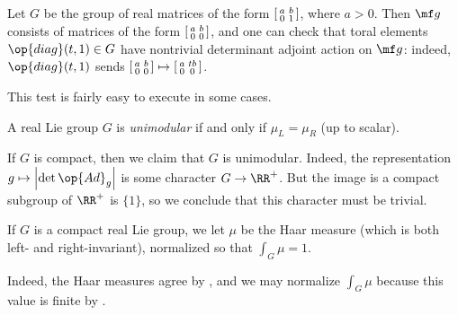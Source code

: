 \documentclass[../notes.tex]{subfiles}
\begin{document}
\begin{example}
	Let $G$ be the group of real matrices of the form $\begin{bsmallmatrix}
		a & b \\ 0 & 1
	\end{bsmallmatrix}$, where $a>0$. Then $\mf g$ consists of matrices of the form $\begin{bsmallmatrix}
		a & b \\ 0 & 0
	\end{bsmallmatrix}$, and one can check that toral elements $\op{diag}(t,1)\in G$ have nontrivial determinant adjoint action on $\mf g$: indeed, $\op{diag}(t,1)$ sends $\begin{bsmallmatrix}
		a & b \\ 0 & 0
	\end{bsmallmatrix}\mapsto\begin{bsmallmatrix}
		a & tb \\ 0 & 0
	\end{bsmallmatrix}$.
\end{example}
This test is fairly easy to execute in some cases.
\begin{definition}[unimodular]
	A real Lie group $G$ is \textit{unimodular} if and only if $\mu_L=\mu_R$ (up to scalar).
\end{definition}
\begin{example} \label{ex:compact-unimodular}
	If $G$ is compact, then we claim that $G$ is unimodular. Indeed, the representation $g\mapsto\left|\det\op{Ad}_g\right|$ is some character $G\to\RR^+$. But the image is a compact subgroup of $\RR^+$ is $\{1\}$, so we conclude that this character must be trivial.
\end{example}
\begin{notation}
	If $G$ is a compact real Lie group, we let $\mu$ be the Haar measure (which is both left- and right-invariant), normalized so that $\int_G\mu=1$.
\end{notation}
Indeed, the Haar measures agree by , and we may normalize $\int_G\mu$ because this value is finite by .
\end{document}
